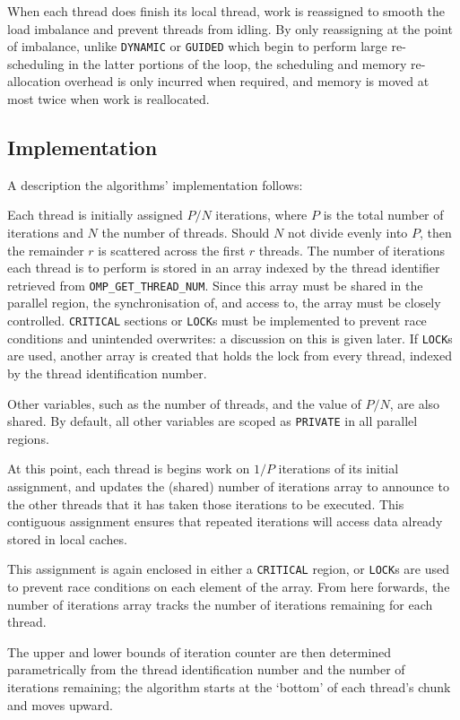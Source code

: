 \documentclass{article} %
\newcommand{\tp}{\texttt}
\begin{document}
When each thread does finish its local thread, work is reassigned to smooth the load imbalance and prevent threads from idling.
By only reassigning at the point of imbalance, unlike \tp{DYNAMIC} or \tp{GUIDED} which begin to perform large re-scheduling in the latter portions of the loop, the scheduling and memory re-allocation overhead is only incurred when required, and memory is moved at most twice when work is reallocated.

\subsection*{Implementation}

A description the algorithms' implementation follows:

Each thread is initially assigned $P/N$ iterations, where $P$ is the total number of iterations and $N$ the number of threads. 
Should $N$ not divide evenly into $P$, then the remainder $r$ is scattered across the first $r$ threads.
The number of iterations each thread is to perform is stored in an array indexed by the thread identifier retrieved from \tp{OMP\_GET\_THREAD\_NUM}.
Since this array must be shared in the parallel region, the synchronisation of, and access to, the array must be closely controlled.
\tp{CRITICAL} sections or \tp{LOCK}s must be implemented to prevent race conditions and unintended overwrites:
a discussion on this is given later.
If \tp{LOCK}s are used, another array is created that holds the lock from every thread, indexed by the thread identification number.

Other variables, such as the number of threads, and the value of $P/N$, are also shared.
By default, all other variables are scoped as \tp{PRIVATE} in all parallel regions.

At this point, each thread is begins work on $1/P$ iterations of its initial assignment, and updates the (shared) number of iterations array to announce to the other threads that it has taken those iterations to be executed.
This contiguous assignment ensures that repeated iterations will access data already stored in local caches.

This assignment is again enclosed in either a \tp{CRITICAL} region, or \tp{LOCK}s are used to prevent race conditions on each element of the array.
From here forwards, the number of iterations array tracks the number of iterations remaining for each thread.

The upper and lower bounds of iteration counter are then determined parametrically from the thread identification number and the number of iterations remaining; the algorithm starts at the `bottom' of each thread's chunk and moves upward.
\end{document}
